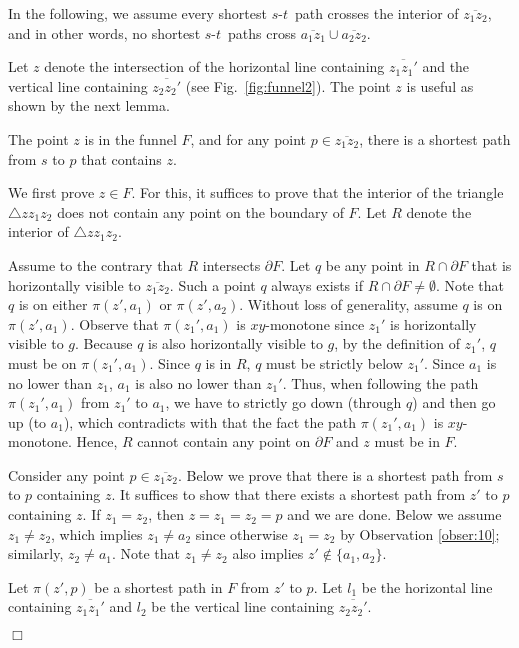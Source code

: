 \documentclass[english,runningheads,11pt]{llncs}
\def\st{$s$-$t$}
\newenvironment{proof}{\noindent {\textbf{Proof:}}\rm}{\hfill $\Box$\rm}
\begin{document}
In the following, we assume every shortest \st\ path crosses the interior of $\overline{z_1z_2}$, and in other words, no shortest \st\ paths cross $\overline{a_1z_1}\cup \overline{a_2z_2}$.

Let $z$ denote the
intersection of the horizontal line containing $\overline{z_1z_1'}$ and the
vertical line containing $\overline{z_2z_2'}$ (see Fig.~\ref{fig:funnel2}).
The point $z$ is useful as shown by the next lemma.

\begin{lemma}\label{lem:110}
The point $z$ is in the funnel $F$, and for any point $p\in
\overline{z_1z_2}$, there is a shortest path
from $s$ to $p$ that contains $z$.
\end{lemma}
\begin{proof}
We first prove $z\in F$. For this, it suffices to prove that the interior of the triangle
$\triangle zz_1z_2$ does not contain any point on the boundary of $F$.
Let $R$ denote the interior of $\triangle zz_1z_2$.

Assume to the contrary that $R$ intersects $\partial F$. Let $q$ be any point in
$R\cap \partial F$ that is horizontally visible to $\overline{z_1z_2}$. Such a point $q$
always exists if $R\cap\partial F\neq \emptyset$. Note that $q$ is on either $\pi(z',a_1)$
or $\pi(z',a_2)$.
Without loss of generality, assume $q$ is on $\pi(z',a_1)$.
Observe that $\pi(z_1',a_1)$ is $xy$-monotone since $z_1'$ is horizontally visible to $g$.
Because $q$ is also horizontally visible to $g$, by the definition of $z_1'$, $q$ must be
on $\pi(z_1',a_1)$. Since $q$ is in $R$, $q$ must be strictly below $z_1'$. Since $a_1$ is no
lower than $z_1$, $a_1$ is also no lower than $z_1'$. Thus, when following the path
$\pi(z_1',a_1)$ from $z_1'$ to $a_1$, we have to strictly go down (through $q$) and then go up
(to $a_1$), which contradicts with that the fact the path $\pi(z_1',a_1)$ is
$xy$-monotone. Hence, $R$ cannot contain any point on $\partial F$ and $z$ must be in $F$.

Consider any point $p\in \overline{z_1z_2}$. Below we prove that there is a shortest path from
$s$ to $p$ containing $z$. It suffices to show that there exists a shortest path from $z'$
to $p$ containing $z$. If $z_1=z_2$, then $z=z_1=z_2=p$ and we are done. Below we assume
$z_1\neq z_2$, which implies $z_1\neq a_2$ since otherwise $z_1=z_2$ by Observation
\ref{obser:10}; similarly, $z_2\neq a_1$. Note that $z_1\neq z_2$ also implies
$z'\not\in \{a_1,a_2\}$.

Let $\pi(z',p)$ be a shortest path in $F$ from $z'$ to $p$. Let $l_1$ be the horizontal line containing $\overline{z_1z_1'}$ and $l_2$ be the vertical line containing $\overline{z_2z_2'}$.


\end{proof}
\end{document}
